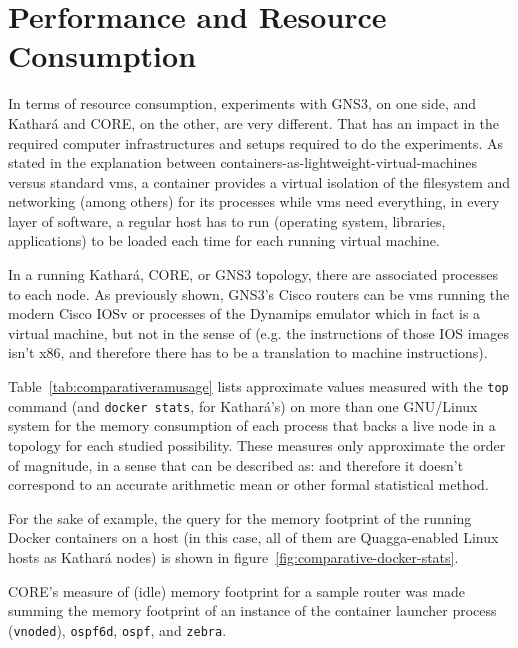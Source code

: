 \section{Performance and Resource Consumption}
\label{sec:comparativeperformance}

In terms of resource consumption, experiments with GNS3, on one side, and Kathará and CORE, on the other, are very different.
That has an impact in the required computer infrastructures and setups required to do the experiments.
As stated in the explanation between containers-as-lightweight-virtual-machines versus standard \glspl{vm}, a container provides a virtual isolation of the filesystem and networking (among others) for its processes while \glspl{vm} need everything, in every layer of software, a regular host has to run (operating system, libraries, applications) to be loaded each time for each running virtual machine.

In a running Kathará, CORE, or GNS3 topology, there are associated processes to each node.
As previously shown, GNS3's Cisco routers can be \glspl{vm} running the modern Cisco IOSv or processes of the Dynamips emulator which in fact is a virtual machine, but not in the sense of  (e.g. the instructions of those IOS images isn't x86, and therefore there has to be a translation to machine instructions).

Table~\ref{tab:comparativeramusage} lists approximate values measured with the \texttt{top} command (and \texttt{docker~stats}, for Kathará's) on more than one GNU/Linux system for the memory consumption of each process that backs a live node in a topology for each studied possibility.
These measures only approximate the order of magnitude, in a sense that can be described as:  and therefore it doesn't correspond to an accurate arithmetic mean or other formal statistical method.



For the sake of example, the query for the memory footprint of the running Docker containers on a host (in this case, all of them are Quagga-enabled Linux hosts as Kathará nodes) is shown in figure~\ref{fig:comparative-docker-stats}.

CORE's measure of (idle) memory footprint for a sample router was made summing the memory footprint of an instance of the container launcher process (\texttt{vnoded}), \texttt{ospf6d}, \texttt{ospf}, and \texttt{zebra}.



